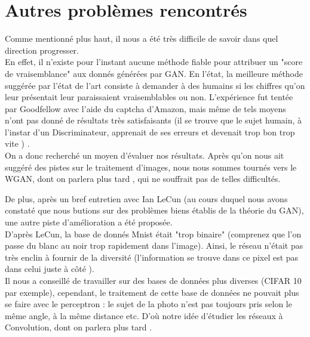 \section{Autres problèmes rencontrés } 
Comme mentionné plus haut, il nous a été très difficile de savoir dans quel direction progresser.\\
En effet, il n'existe pour l'instant aucune méthode fiable pour attribuer un "score de vraisemblance"  aux donnés générées par GAN. En l'état, la meilleure méthode suggérée par l'état de l'art consiste à demander à des humains si les chiffres qu'on leur présentait leur paraissaient vraisemblables ou non. L'expérience fut tentée par Goodfellow avec l'aide du captcha d'Amazon, mais même de tels moyens n'ont pas donné de résultats très satisfaisants (il se trouve que le sujet humain, à l'instar d'un Discriminateur, apprenait de ses erreurs et devenait trop bon trop vite ) . \\
On a donc recherché un moyen d'évaluer nos résultats. Après qu'on nous ait suggéré des pistes sur le traitement d'images, nous nous sommes tournés vers le WGAN, dont on parlera plus tard , qui ne souffrait pas de telles difficultés. 

De plus, après un bref entretien avec Ian LeCun (au cours duquel nous avons constaté que nous butions sur des problèmes biens établis de la théorie du GAN), une autre piste d'amélioration a été proposée. \\
D'après LeCun, la base de donnés Mnist était "trop binaire" (comprenez que l'on passe du blanc au noir trop rapidement dans l'image). Ainsi, le réseau n'était pas très enclin à fournir de la diversité (l'information se trouve dans ce pixel est pas dans celui juste à côté ). \\
Il nous  a conseillé de travailler sur des bases de données plus diverses (CIFAR 10 par exemple), cependant, le traitement de cette base de données ne pouvait plus se faire avec le perceptron : le sujet de la photo n'est pas toujours pris selon le même angle, à la même distance etc. D'où notre idée d'étudier les réseaux à Convolution, dont on parlera plus tard . \\

